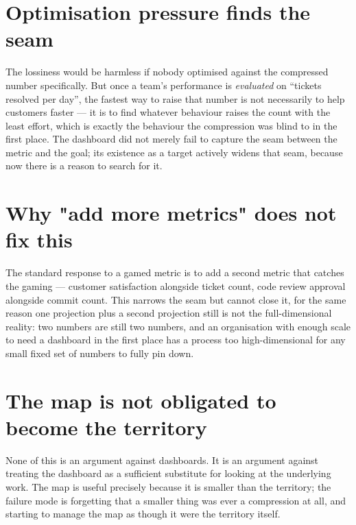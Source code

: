 \documentclass{tufte-handout}
\begin{document}
\section{Optimisation pressure finds the seam}

The lossiness would be harmless if nobody optimised against the
compressed number specifically. But once a team's performance is
\emph{evaluated} on ``tickets resolved per day'', the fastest way to
raise that number is not necessarily to help customers faster --- it
is to find whatever behaviour raises the count with the least effort,
which is exactly the behaviour the compression was blind to in the
first place. The dashboard did not merely fail to capture the
seam between the metric and the goal; its existence as a target
actively widens that seam, because now there is a reason to search
for it.

\section{Why "add more metrics" does not fix this}

The standard response to a gamed metric is to add a second metric
that catches the gaming --- customer satisfaction alongside ticket
count, code review approval alongside commit count. This narrows the
seam but cannot close it, for the same reason one projection plus a
second projection still is not the full-dimensional reality: two
numbers are still two numbers, and an organisation with enough scale
to need a dashboard in the first place has a process too
high-dimensional for any small fixed set of numbers to fully pin
down.

\section{The map is not obligated to become the territory}

None of this is an argument against dashboards. It is an argument
against treating the dashboard as a sufficient substitute for
looking at the underlying work. The map is useful precisely because
it is smaller than the territory; the failure mode is forgetting
that a smaller thing was ever a compression at all, and starting to
manage the map as though it were the territory itself.
\end{document}
